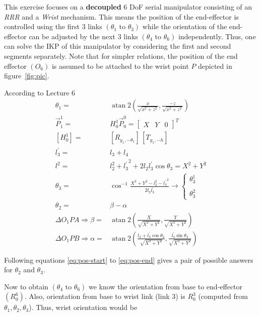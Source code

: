 \documentclass[12pt, a4paper]{article}
\begin{document}
This exercise focuses on a \textbf{decoupled} 6 DoF serial manipulator consisting of an \textit{RRR} and a \textit{Wrist} mechanism. This means the position of the end-effector is controlled using the first 3 links \((\theta_1 \text{ to } \theta_3)\) while the orientation of the end-effector can be adjusted by the next 3 links \((\theta_4 \text{ to } \theta_6)\) independently. Thus, one can solve the IKP of this manipulator by considering the first and second segments separately. Note that for simpler relations, the position of the end effector \((O_6)\) is assumed to be attached to the wrist point \(P\) depicted in figure~\ref{fig:pic}.

According to Lecture 6
\begin{align}
    \theta_1 =& \operatorname{atan}2\left(\frac{x}{\sqrt{x^2+z^2}}, \frac{-z}{\sqrt{x^2+z^2}}\right) \label{eq:pos-start}\\
    \vec{P}_1^{1}=&H_0^{1} \vec{P}_0^0 = \begin{bmatrix}
        X & Y & 0
    \end{bmatrix}^T \\
    [H_0^{1}]=&[{R}_{y_1, -\theta_1}] \, [T_{y_1, -h}] \\
    l_3^\prime = &l_3 + l_4 \\
    l^2=&l_2^2+{l_3^\prime}^2+2 l_2 {l_3^\prime} \cos \theta_3=X^2+Y^2 \\
    \theta_3=&\cos^{-1} \frac{X^2+Y^2-l_2^2-{l_3^\prime}^2}{2 l_2 {l_3^\prime}} \rightarrow \left\{\begin{array}{l}
\theta_3^1 \\
\\
\theta_3^2
\end{array}\right. \\
\theta_2=&\beta-\alpha \\
\Delta O_1 P A \Rightarrow \beta=&\operatorname{atan}2\left(\frac{X}{\sqrt{X^2+Y^2}}, \frac{Y}{\sqrt{X^2+Y^2}}\right) \\
\Delta O_1 P B \Rightarrow \alpha=&\operatorname{atan}2\left(\frac{l_2+{l_3^\prime} \cos \theta_3}{\sqrt{X^2+Y^2}}, \frac{{l_3^\prime} \sin \theta_3}{\sqrt{X^2+Y^2}}\right) \label{eq:pos-end}
\end{align}

Following equations \ref{eq:pos-start} to \ref{eq:pos-end} gives a pair of possible answers for \(\theta_2\) and \(\theta_3\).

\vspace{15pt}

\noindent Now to obtain \((\theta_4 \text{ to } \theta_6)\) we know the orientation from base to end-effector \((R_0^6)\). Also, orientation from base to wrist link (link 3) is \(R_0^3\) (computed from \(\theta_1, \theta_2, \theta_3\)). Thus, wrist orientation would be
\end{document}
